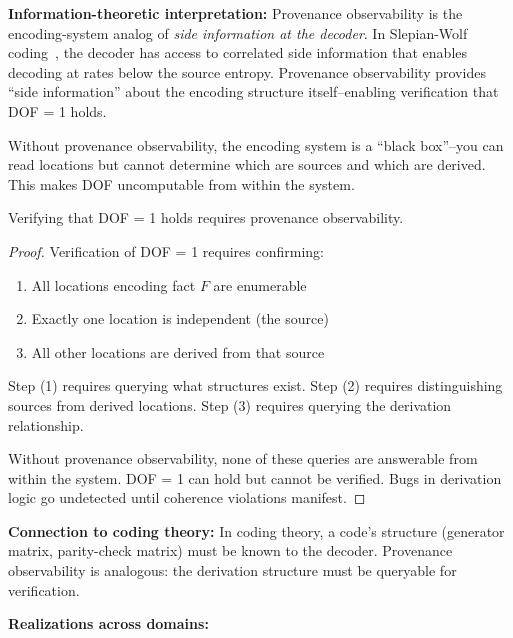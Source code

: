 \textbf{Information-theoretic interpretation:} Provenance observability is the encoding-system analog of \emph{side information at the decoder}. In Slepian-Wolf coding~\cite{slepian1973noiseless}, the decoder has access to correlated side information that enables decoding at rates below the source entropy. Provenance observability provides ``side information'' about the encoding structure itself--enabling verification that DOF = 1 holds.

Without provenance observability, the encoding system is a ``black box''--you can read locations but cannot determine which are sources and which are derived. This makes DOF uncomputable from within the system.

\begin{theorem}[Provenance Observability is Necessary for Verifiable DOF = 1]\label{thm:provenance-necessary}
Verifying that DOF = 1 holds requires provenance observability.
\end{theorem}

\begin{proof}
Verification of DOF = 1 requires confirming:
\begin{enumerate}
\tightlist
\item All locations encoding fact $F$ are enumerable
\item Exactly one location is independent (the source)
\item All other locations are derived from that source
\end{enumerate}

Step (1) requires querying what structures exist. Step (2) requires distinguishing sources from derived locations. Step (3) requires querying the derivation relationship.

Without provenance observability, none of these queries are answerable from within the system. DOF = 1 can hold but cannot be verified. Bugs in derivation logic go undetected until coherence violations manifest.
\end{proof}

\textbf{Connection to coding theory:} In coding theory, a code's structure (generator matrix, parity-check matrix) must be known to the decoder. Provenance observability is analogous: the derivation structure must be queryable for verification.

\textbf{Realizations across domains:}

